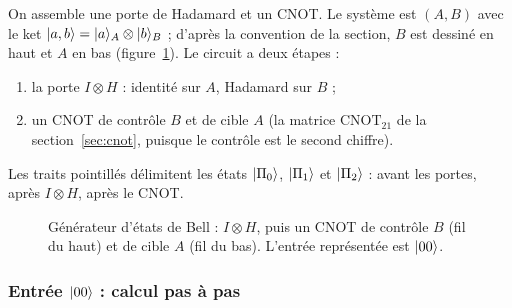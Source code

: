 On assemble une porte de Hadamard et un CNOT. Le système est $(A,B)$ avec le ket
$|a,b\rangle=|a\rangle_A\otimes|b\rangle_B$ ; d'après la convention de la section, $B$ est dessiné
en haut et $A$ en bas (figure~\ref{fig:circuit-bell}). Le circuit a deux étapes :
\begin{enumerate}[nosep]
  \item la porte $I\otimes H$ : identité sur $A$, Hadamard sur $B$ ;
  \item un CNOT de contrôle $B$ et de cible $A$ (la matrice $\mathrm{CNOT}_{21}$ de la
        section~\ref{sec:cnot}, puisque le contrôle est le second chiffre).
\end{enumerate}
Les traits pointillés délimitent les états $|\Pi_0\rangle$, $|\Pi_1\rangle$ et $|\Pi_2\rangle$ :
avant les portes, après $I\otimes H$, après le CNOT.

\begin{figure}[!ht]
\centering
{}
\caption{Générateur d'états de Bell : $I\otimes H$, puis un CNOT de contrôle $B$ (fil du haut)
et de cible $A$ (fil du bas). L'entrée représentée est $|00\rangle$.}
\label{fig:circuit-bell}
\end{figure}

\subsubsection{Entrée \texorpdfstring{$|00\rangle$}{|00>} : calcul pas à pas}

